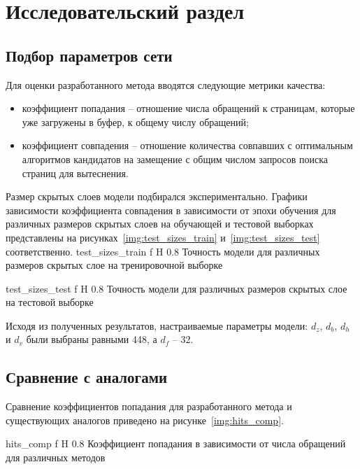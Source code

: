 \chapter{Исследовательский раздел}

\section{Подбор параметров сети}
Для оценки разработанного метода вводятся следующие метрики качества:
\begin{itemize}
	\item коэффициент попадания -- отношение числа обращений к страницам, которые уже загружены в буфер, к общему числу обращений;
	\item коэффициент совпадения -- отношение количества совпавших с оптимальным алгоритмов кандидатов на замещение с общим числом запросов поиска страниц для вытеснения.
\end{itemize}

Размер скрытых слоев модели подбирался экспериментально.
Графики зависимости коэффициента совпадения в зависимости от эпохи обучения для различных размеров скрытых слоев на обучающей и тестовой выборках представлены на рисунках~\ref{img:test_sizes_train} и~\ref{img:test_sizes_test} соответственно.
{test_sizes_train} %
{f} %
{H} %
{0.8\textwidth} %
{Точность модели для различных размеров скрытых слое на тренировочной выборке} %

{test_sizes_test} %
{f} %
{H} %
{0.8\textwidth} %
{Точность модели для различных размеров скрытых слое на тестовой выборке} %

Исходя из полученных результатов, настраиваемые параметры модели: $d_z$, $d_b$, $d_h$ и $d_v$ были выбраны равными 448, а $d_f$ -- 32.

\section{Сравнение с аналогами}
Сравнение коэффициентов попадания для разработанного метода и существующих аналогов приведено на рисунке~\ref{img:hits_comp}.

{hits_comp} %
{f} %
{H} %
{0.8\textwidth} %
{Коэффициент попадания в зависимости от числа обращений для различных методов} %

